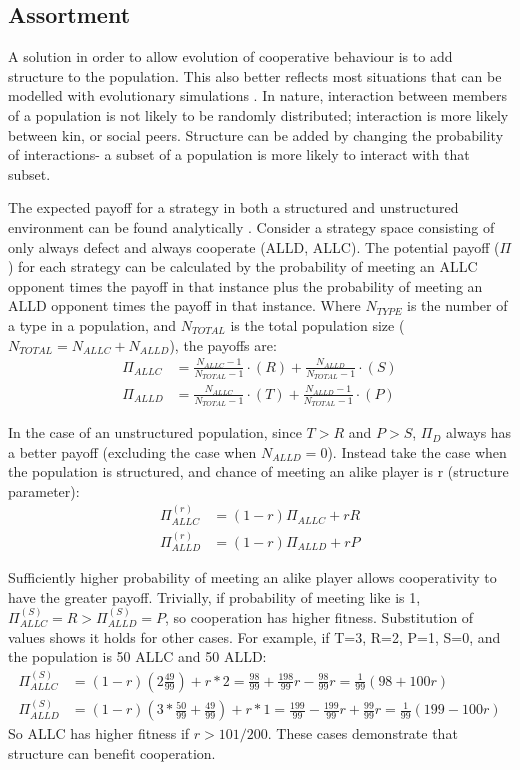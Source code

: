\documentclass[a4paper,11pt,bcshonoursthesis,singlespace,twoside,thesisdraft,pdflatex]{cssethesis}
\begin{document}
\subsection{Assortment}
A solution in order to allow evolution of cooperative behaviour is to add structure to the population. 
This also better reflects most situations that can be modelled with evolutionary simulations \citep{eshel:PNAS:1982}. 
In nature, interaction between members of a population is not likely to be randomly distributed; interaction is more likely between kin, or social peers. 
Structure can be added by changing the probability of interactions- a subset of a population is more likely to interact with that subset. 

The expected payoff for a strategy in both a structured and unstructured environment can be found analytically \citep{van-veelen:PNAS:2012}. 
Consider a strategy space consisting of only always defect and always cooperate (ALLD, ALLC). 
The potential payoff ($\Pi$) for each strategy can be calculated by the probability of meeting an ALLC opponent times the payoff in that instance plus the probability of meeting an ALLD opponent times the payoff in that instance. Where $N_{TYPE}$ is the number of a type in a population, and $N_{TOTAL}$ is the total population size ($N_{TOTAL}=N_{ALLC}+ N_{ALLD}$), the payoffs are:
\begin{align*}
\Pi_{ALLC}&=\frac{N_{ALLC}-1}{N_{TOTAL}-1} \cdot (R) + \frac{N_{ALLD}}{N_{TOTAL}-1}\cdot ({S})\\
\Pi_{ALLD}&=\frac{N_{ALLC}}{N_{TOTAL}-1} \cdot (T) + \frac{N_{ALLD}-1}{N_{TOTAL}-1}\cdot ({P})
\end{align*}

In the case of an unstructured population, since $T>R$ and $P>S$, $\Pi_D$ always has a better payoff (excluding the case when $N_{ALLD}=0$). 
Instead take the case when the population is structured, and chance of meeting an alike player is r (structure parameter):
\begin{align*}
\Pi^{(r)}_{ALLC}&=(1-r)\Pi_{ALLC}+ rR\\
\Pi^{(r)}_{ALLD}&=(1-r)\Pi_{ALLD}+ rP
\end{align*}

Sufficiently higher probability of meeting an alike player allows cooperativity to have the greater payoff. 
Trivially, if probability of meeting like is 1, $\Pi^{(S)}_{ALLC}=R>\Pi^{(S)}_{ALLD}=P$, so cooperation has higher fitness.  
Substitution of values shows it holds for other cases. 
For example, if T=3, R=2, P=1, S=0, and the population is 50 ALLC and 50 ALLD:
\begin{align*}
\Pi^{(S)}_{ALLC}&=(1-r)(2\frac{49}{99})+r*2=\frac{98}{99}+\frac{198}{99}r-\frac{98}{99}r=\frac{1}{99}(98+100r)\\
\Pi^{(S)}_{ALLD}&=(1-r)(3*\frac{50}{99} + \frac{49}{99})+ r*1=\frac{199}{99}-\frac{199}{99}r+\frac{99}{99}r=\frac{1}{99}(199-100r)
\end{align*}
So ALLC has higher fitness if $r>101/200$. These cases demonstrate that structure can benefit cooperation. 
\end{document}
